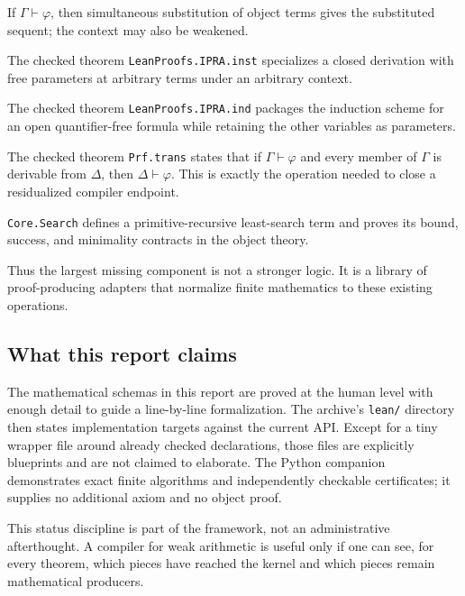 \begin{description}[style=nextline,leftmargin=2.2em]
\item[Substitution and weakening.] If \(\Gamma\vdash\varphi\), then simultaneous substitution of object terms gives the substituted sequent; the context may also be weakened.

\item[Instantiation of closed derivations.]  The checked theorem \texttt{LeanProofs.IPRA.inst} specializes a closed derivation with free parameters at arbitrary terms under an arbitrary context.

\item[Quantifier-free induction.]  The checked theorem \texttt{LeanProofs.IPRA.ind} packages the \iPRA{} induction scheme for an open quantifier-free formula while retaining the other variables as parameters.

\item[Simultaneous cut.]  The checked theorem \texttt{Prf.trans} states that if \(\Gamma\vdash\varphi\) and every member of \(\Gamma\) is derivable from \(\Delta\), then \(\Delta\vdash\varphi\).  This is exactly the operation needed to close a residualized compiler endpoint.

\item[Bounded least search.]  \texttt{Core.Search} defines a primitive-recursive least-search term and proves its bound, success, and minimality contracts in the object theory.
\end{description}

Thus the largest missing component is not a stronger logic.  It is a library of proof-producing adapters that normalize finite mathematics to these existing operations.

\subsection{What this report claims}

The mathematical schemas in this report are proved at the human level with enough detail to guide a line-by-line formalization.  The archive's \texttt{lean/} directory then states implementation targets against the current API.  Except for a tiny wrapper file around already checked declarations, those files are explicitly blueprints and are not claimed to elaborate.  The Python companion demonstrates exact finite algorithms and independently checkable certificates; it supplies no additional axiom and no object proof.

This status discipline is part of the framework, not an administrative afterthought.  A compiler for weak arithmetic is useful only if one can see, for every theorem, which pieces have reached the kernel and which pieces remain mathematical producers.
